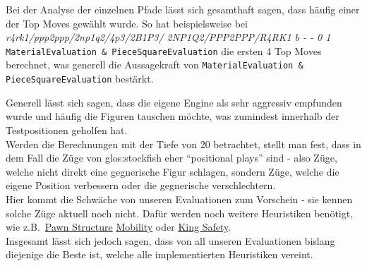Bei der Analyse der einzelnen Pfade lässt sich gesamthaft sagen, dass häufig einer der Top
Moves gewählt wurde. So hat beispielsweise bei \textit{r4rk1/ppp2ppp/2np1q2/4p3/2B1P3/ 2NP1Q2/PPP2PPP/R4RK1 b - - 0 1}
\texttt{MaterialEvaluation \& PieceSquareEvaluation} die ersten 4 Top Moves berechnet, was generell die Aussagekraft
von \texttt{MaterialEvaluation \& PieceSquareEvaluation} bestärkt.

Generell lässt sich sagen, dass die eigene Engine als sehr aggressiv empfunden wurde und häufig die Figuren tauschen möchte, was
zumindest innerhalb der Testpositionen geholfen hat. \\
Werden die Berechnungen mit der Tiefe von 20 betrachtet, stellt man fest, dass in dem Fall die Züge von \gls{glos:stockfish}
eher \enquote{positional plays} sind - also Züge, welche nicht direkt eine gegnerische Figur schlagen, sondern Züge, welche die
eigene Position verbessern oder die gegnerische verschlechtern. \\
Hier kommt die Schwäche von unseren Evaluationen zum Vorschein - sie kennen solche Züge aktuell noch nicht.
Dafür werden noch weitere Heuristiken benötigt, wie z.B.~\href{https://www.chessprogramming.org/Pawn_Structure}{Pawn Structure}
\href{https://www.chessprogramming.org/Mobility}{Mobility} oder \href{https://www.chessprogramming.org/King_Safety}{King Safety}.\\
Insgesamt lässt sich jedoch sagen, dass von all unseren Evaluationen bislang diejenige die Beste ist, welche
alle implementierten Heuristiken vereint.